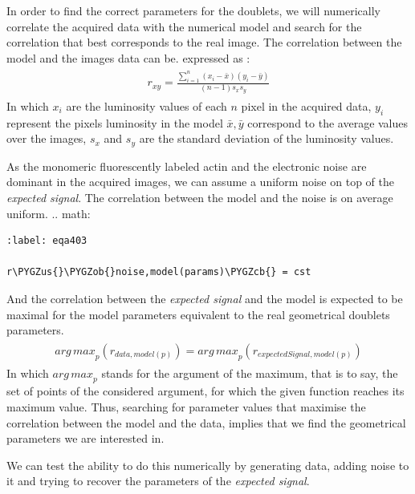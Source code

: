 \documentclass[A4paperpaper,11pt,english]{sphinxmanual}
\def\PYGZus{\char`\_}
\def\PYGZob{\char`\{}
\def\PYGZcb{\char`\}}
\begin{document}
In order to find the correct parameters for the doublets, we will numerically correlate
the acquired data with the numerical model and search for the correlation
that best corresponds to the real image. The correlation between the model and the images
data can be. expressed as :
\label{index-latex:equation-eqa402}\begin{gather}
\begin{split}r_{xy}=\frac{\sum\limits_{i=1}^n (x_i-\bar{x})(y_i-\bar{y})}{(n-1) s_x s_y}\end{split}\label{index-latex-eqa402}
\end{gather}
In which \(x_i\) are the luminosity values of each \(n\) pixel in
the acquired data, \(y_i\) represent the pixels luminosity in the model
\(\bar{x},\bar{y}\) correspond to the average values over the images,
\(s_x\) and \(s_y\) are the standard deviation of the luminosity
values.

As the monomeric fluorescently labeled actin and the electronic noise are dominant
in the acquired images, we can assume a uniform noise on top of the \emph{expected signal}. The correlation between the model and the noise is on average
uniform.
.. math:

\begin{Verbatim}[commandchars=\\\{\}]
:label: eqa403

r\PYGZus{}\PYGZob{}noise,model(params)\PYGZcb{} = cst
\end{Verbatim}

And the correlation between the \emph{expected signal} and the model is expected to be
maximal for the model parameters  equivalent to the real geometrical
doublets parameters.
\label{index-latex:equation-eqa404}\begin{gather}
\begin{split}{arg\,max}_p\left(r_{data,model(p)}\right)= {arg\,max}_p \left(r_{expectedSignal,model(p)}\right)\end{split}\label{index-latex-eqa404}
\end{gather}
In which \({arg\,max}_p\) stands for the
argument of the maximum, that is to say, the set of points of the considered
argument, for which the given function reaches its maximum value. Thus, searching
for parameter values that maximise the correlation between the model and
the data, implies that we find the geometrical parameters we are interested in.

We can test the ability to do this numerically by generating data, adding noise
to it and trying to recover the parameters of the \emph{expected signal}.
\end{document}
